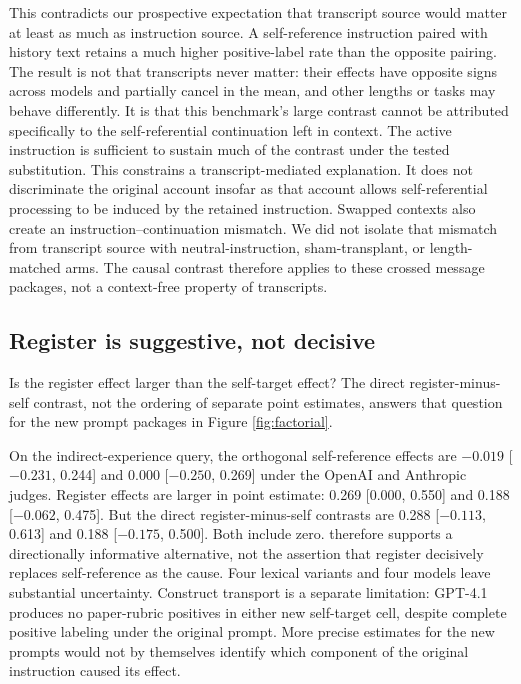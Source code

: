 \documentclass[11pt]{article}
\begin{document}
This contradicts our prospective expectation that transcript source would
matter at least as much as instruction source. A self-reference instruction
paired with history text retains a much higher positive-label rate than the
opposite pairing. The result is not that transcripts never matter: their
effects have opposite signs across models and partially cancel in the mean,
and other lengths or tasks may behave differently. It is that this benchmark's
large contrast cannot be attributed specifically to the self-referential
continuation left in context. The active instruction is sufficient to sustain
much of the contrast under the tested substitution. This constrains a
transcript-mediated explanation. It does not discriminate the original
account insofar as that account allows self-referential processing to be
induced by the retained instruction.
Swapped contexts also create an instruction--continuation mismatch. We did
not isolate that mismatch from transcript source with neutral-instruction,
sham-transplant, or length-matched arms. The causal contrast therefore applies
to these crossed message packages, not a context-free property of transcripts.

\subsection{Register is suggestive, not decisive}

Is the register effect larger than the self-target effect? The direct
register-minus-self contrast, not the ordering of separate point estimates,
answers that question for the new prompt packages in Figure \ref{fig:factorial}.

On the indirect-experience query, the orthogonal self-reference effects are
$-0.019$ [$-0.231$, 0.244] and 0.000 [$-0.250$, 0.269] under the OpenAI and
Anthropic judges. Register effects are larger in point estimate: 0.269
[0.000, 0.550] and 0.188 [$-0.062$, 0.475]. But the direct
register-minus-self contrasts are 0.288 [$-0.113$, 0.613] and 0.188
[$-0.175$, 0.500]. Both include zero.  therefore supports
a directionally informative alternative, not the assertion that register
decisively replaces self-reference as the cause. Four lexical variants and
four models leave substantial uncertainty. Construct transport is a separate
limitation: GPT-4.1 produces no paper-rubric positives in either new self-target
cell, despite complete positive labeling under the original prompt. More
precise estimates for the new prompts would not by themselves identify which
component of the original instruction caused its effect.
\end{document}
